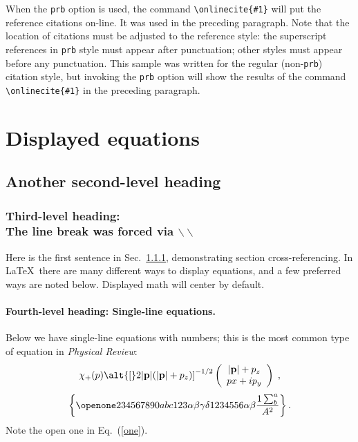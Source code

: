 When the {\tt prb} option is used, the command \verb+\onlinecite{#1}+ will
put the reference citations on-line. It was used in the preceding paragraph.
Note that the location of citations must be adjusted to the reference style:
the superscript references in {\tt prb} style must appear after punctuation;
other styles must appear before any punctuation\cite{bibtex}. This sample was written
for the regular (non-{\tt prb}) citation style, but invoking the
{\tt prb} option will show the results of  the command \verb+\onlinecite{#1}+
in the preceding paragraph.

\section{Displayed equations}
\subsection{Another second-level heading}
\subsubsection{Third-level heading:\protect\\ The line break was forced via
$\backslash\backslash$}
\label{sec:level3}

Here is the first sentence in Sec.\ \ref{sec:level3}, demonstrating
section cross-referencing.
In \LaTeX\ there are many different ways to display equations, and a
few preferred ways are noted below.
Displayed math will center by default.

\paragraph{Fourth-level heading: Single-line equations.}
Below we have single-line equations with numbers; this is
the most common type of equation in {\it Physical Review\/}:
\begin{equation}
\chi_+(p)\alt{\bf [}2|{\bf p}|(|{\bf p}|+p_z){\bf ]}^{-1/2}
\left(
\begin{array}{c}
|{\bf p}|+p_z\\
px+ip_y
\end{array}\right)\;,
\end{equation}
\begin{equation}
\left\{\openone234567890abc123\alpha\beta\gamma\delta%
1234556\alpha\beta{1\sum^{a}_{b}\over A^2}\right\}\label{one}.
\end{equation}
Note the open one in Eq.\ (\ref{one}).

